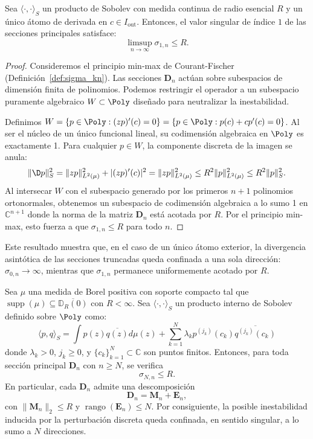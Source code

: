 \begin{thm}\label{thm:acotacion_sigma_1}
	Sea $\langle \cdot, \cdot \rangle_S$ un producto de Sobolev con medida continua de radio esencial $R$ y un único átomo de derivada en $c \in I_{\mathrm{out}}$. Entonces, el valor singular de índice $1$ de las secciones principales satisface:
	$$ \limsup_{n \to \infty} \sigma_{1,n} \le R. $$
\end{thm}

\begin{proof}
	Consideremos el principio min-max de Courant-Fischer (Definición~\ref{def:sigma_kn}). Las secciones $\mathbf{D}_n$ actúan sobre subespacios de dimensión finita de polinomios. Podemos restringir el operador a un subespacio puramente algebraico $W \subset \Poly$ diseñado para neutralizar la inestabilidad.

	Definimos $W = \{ p \in \Poly : (zp)'(c) = 0 \} = \{ p \in \Poly : p(c) + c p'(c) = 0 \}$. Al ser el núcleo de un único funcional lineal, su codimensión algebraica en $\Poly$ es exactamente 1. Para cualquier $p \in W$, la componente discreta de la imagen se anula:
	$$ \|\D p\|_S^2 = \|zp\|_{L^2(\mu)}^2 + |(zp)'(c)|^2 = \|zp\|_{L^2(\mu)}^2 \le R^2 \|p\|_{L^2(\mu)}^2 \le R^2 \|p\|_S^2. $$
	Al intersecar $W$ con el subespacio generado por los primeros $n+1$ polinomios ortonormales, obtenemos un subespacio de codimensión algebraica a lo sumo 1 en $\mathbb{C}^{n+1}$ donde la norma de la matriz $\mathbf{D}_n$ está acotada por $R$. Por el principio min-max, esto fuerza a que $\sigma_{1,n} \le R$ para todo $n$.
\end{proof}

Este resultado muestra que, en el caso de un único átomo exterior, la divergencia asintótica de las secciones truncadas queda confinada a una sola dirección: $\sigma_{0,n} \to \infty$, mientras que $\sigma_{1,n}$ permanece uniformemente acotado por $R$.

\begin{thm}\label{thm:control_singular_escape}
	Sea $\mu$ una medida de Borel positiva con soporte compacto tal que $\operatorname{supp}(\mu) \subseteq \overline{\mathbb{D}_R(0)}$ con $R < \infty$. Sea $\langle \cdot, \cdot \rangle_S$ un producto interno de Sobolev definido sobre $\Poly$ como:
	\begin{equation}\label{eq:sobolev_general_singular}
		\langle p, q \rangle_S = \int p(z)\overline{q(z)} d\mu(z) + \sum_{k=1}^N \lambda_k p^{(j_k)}(c_k) \overline{q^{(j_k)}(c_k)}
	\end{equation}
	donde $\lambda_k > 0$, $j_k \ge 0$, y $\{c_k\}_{k=1}^N \subset \mathbb{C}$ son puntos finitos. Entonces, para toda sección principal $\mathbf{D}_n$ con $n \ge N$, se verifica
	\[
		\sigma_{N,n} \le R.
	\]
	En particular, cada $\mathbf{D}_n$ admite una descomposición
	\[
		\mathbf{D}_n = \mathbf{M}_n + \mathbf{E}_n,
	\]
	con $\|\mathbf{M}_n\|_2 \le R$ y $\operatorname{rango}(\mathbf{E}_n) \le N$. Por consiguiente, la posible inestabilidad inducida por la perturbación discreta queda confinada, en sentido singular, a lo sumo a $N$ direcciones.
\end{thm}

